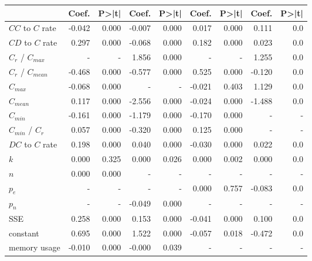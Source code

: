 \begin{tabular}{lrrrrrrrr}
\toprule
{} &  Coef. &  P>|t| &  Coef. &  P>|t| &  Coef. &  P>|t| &  Coef. &  P>|t| \\
\midrule
$CC$ to $C$ rate   & -0.042 &  0.000 & -0.007 &  0.000 &  0.017 &  0.000 &  0.111 &    0.0 \\
$CD$ to $C$ rate   &  0.297 &  0.000 & -0.068 &  0.000 &  0.182 &  0.000 &  0.023 &    0.0 \\
$C_r$ / $C_{max}$  &      - &      - &  1.856 &  0.000 &      - &      - &  1.255 &    0.0 \\
$C_r$ / $C_{mean}$ & -0.468 &  0.000 & -0.577 &  0.000 &  0.525 &  0.000 & -0.120 &    0.0 \\
$C_{max}$          & -0.068 &  0.000 &      - &      - & -0.021 &  0.403 &  1.129 &    0.0 \\
$C_{mean}$         &  0.117 &  0.000 & -2.556 &  0.000 & -0.024 &  0.000 & -1.488 &    0.0 \\
$C_{min}$          & -0.161 &  0.000 & -1.179 &  0.000 & -0.170 &  0.000 &      - &      - \\
$C_{min}$ / $C_r$  &  0.057 &  0.000 & -0.320 &  0.000 &  0.125 &  0.000 &      - &      - \\
$DC$ to $C$ rate   &  0.198 &  0.000 &  0.040 &  0.000 & -0.030 &  0.000 &  0.022 &    0.0 \\
$k$                &  0.000 &  0.325 &  0.000 &  0.026 &  0.000 &  0.002 &  0.000 &    0.0 \\
$n$                &  0.000 &  0.000 &      - &      - &      - &      - &      - &      - \\
$p_e$              &      - &      - &      - &      - &  0.000 &  0.757 & -0.083 &    0.0 \\
$p_n$              &      - &      - & -0.049 &  0.000 &      - &      - &      - &      - \\
SSE                &  0.258 &  0.000 &  0.153 &  0.000 & -0.041 &  0.000 &  0.100 &    0.0 \\
constant           &  0.695 &  0.000 &  1.522 &  0.000 & -0.057 &  0.018 & -0.472 &    0.0 \\
memory usage       & -0.010 &  0.000 & -0.000 &  0.039 &      - &      - &      - &      - \\
\bottomrule
\end{tabular}
